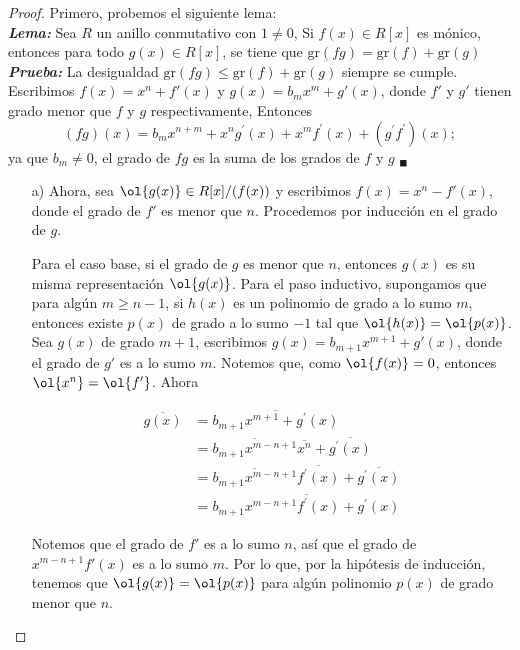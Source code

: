 \begin{problem}[14]
\end{problem}
\newcommand{\gr}{\mbox{gr}}
\begin{proof}
    Primero, probemos el siguiente lema: \\
    \textit{\textbf{Lema:}} Sea $R$ un anillo conmutativo con $1 \neq 0$, Si $f(x) \in R[x]$ es mónico, entonces para todo $g(x) \in R[x]$, se tiene que $\gr(fg) = \gr(f) + \gr(g)$ \\
    \textit{\textbf{Prueba:}} La desigualdad $\gr(fg) \leq \gr(f) + \gr(g)$ siempre se cumple. Escribimos $f(x) = x^n + f'(x)$ y $g(x) = b_mx^m + g'(x)$, donde $f'$ y $g'$ tienen grado menor que $f$ y $g$ respectivamente, Entonces 
    $$ (fg)(x) = b_mx^{n+m} + x^ng^\prime(x) + x^mf^\prime(x) + (g^\prime f^\prime)(x); $$
    ya que $b_m \neq 0$, el grado de $fg$ es la suma de los grados de $f$ y $g$ \hfill $_\blacksquare$

    \begin{enumerate}
        \item[a)] Ahora, sea $\ol{g(x)} \in R[x] / (f(x))$ y escribimos $f(x) = x^n - f'(x)$, donde el grado de $f'$ es menor que $n$. Procedemos por inducción en el grado de $g$.
        
        Para el caso base, si el grado de $g$ es menor que $n$, entonces $g(x)$ es su misma representación $\ol{g(x)}$. Para el paso inductivo, supongamos que para algún $m \geq n-1$, si $h(x)$ es un polinomio de grado a lo sumo $m$, entonces existe $p(x)$ de grado a lo sumo $-1$ tal que $\ol{h(x)} = \ol{p(x)}$. Sea $g(x)$ de grado $m+1$, escribimos $g(x) = b_{m+1}x^{m+1} + g'(x)$, donde el grado de $g'$ es a lo sumo $m$. Notemos que, como $\ol{f(x)} = 0$, entonces $\ol{x^n} = \ol{f'}$. Ahora

        \begin{align*}
            \overline{g(x)} &= \overline{b_{m+1} x^{m+1} + g^\prime(x)}\\
            &= \overline{b_{m+1}x^{m-n+1}}\overline{x^n} + \overline{g^\prime(x)}\\ 
            &= \overline{b_{m+1}x^{m-n+1}}\overline{f^\prime(x)} + \overline{g^\prime(x)} \\
            &= \overline{b_{m+1}x^{m-n+1}f^\prime(x) + g^\prime(x)}
        \end{align*}

        Notemos que el grado de $f'$ es a lo sumo $n$, así que el grado de $x^{m-n+1}f'(x)$ es a lo sumo $m$. Por lo que, por la hipótesis de inducción, tenemos que $\ol{g(x)} = \ol{p(x)} $ para algún polinomio $p(x)$ de grado menor que $n$.
        

\end{enumerate}
\end{proof}
